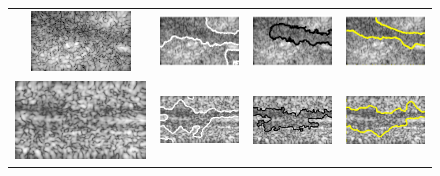 \begin{figure}[t]
\begin{tabular}{@{}cccc@{}}
		\\		
		\includegraphics[width=.23\linewidth]{./images/DL2S/compare/vessFIRvol18_orig} &
		\includegraphics[width=.23\linewidth]{./images/DL2S/compare/vessFIRvol18_CV} &		
		\includegraphics[width=.23\linewidth]{./images/DL2S/compare/vessFIRvol18_L2S_p2_c} &		
		\includegraphics[width=.23\linewidth]{./images/DL2S/compare/vessFIRvol18_DL} 
		\\		
		\includegraphics[width=.23\linewidth]{./images/DL2S/compare/vessINVIVO15_orig} &
		\includegraphics[width=.23\linewidth]{./images/DL2S/compare/vessINVIVO15_CV} &		
		\includegraphics[width=.23\linewidth]{./images/DL2S/compare/vessINVIVO15_L2S_p2_c} &		
		\includegraphics[width=.23\linewidth]{./images/DL2S/compare/vessINVIVO15_DL} 

\end{tabular}
\end{figure}
